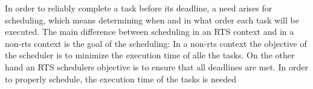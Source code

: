 
In order to reliably complete a task before its deadline, a need arises for
scheduling, which means determining when and in what order each task will be
executed. The main difference between scheduling in an RTS context and in a
non-rts context is the goal of the scheduling: In a non-rts context the
objective of the scheduler is to minimize the execution time of alle the tasks.
On the other hand an RTS schedulers objective is to ensure that all deadlines
are met. In order to properly schedule, the execution time of the tasks is
needed


% 




